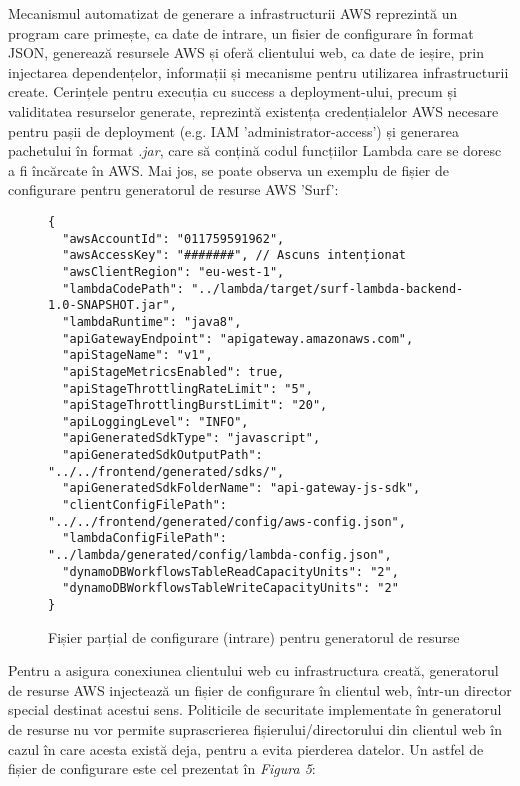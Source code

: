 \noindent
Mecanismul automatizat de generare a infrastructurii AWS reprezintă un program care primește, ca date de intrare, un fisier de configurare în format JSON, generează resursele AWS și oferă clientului web, ca date de ieșire, prin injectarea dependențelor, informații și mecanisme pentru utilizarea infrastructurii create. Cerințele pentru execuția cu success a deployment-ului, precum și validitatea resurselor generate, reprezintă existența credențialelor AWS necesare pentru pașii de deployment (e.g. IAM 'administrator-access') și generarea pachetului în format \emph{.jar}, care să conțină codul funcțiilor Lambda care se doresc a fi încărcate în AWS. Mai jos, se poate observa un exemplu de fișier de configurare pentru generatorul de resurse AWS 'Surf':

\begin{figure}[ht]
\begin{verbatim}
{
  "awsAccountId": "011759591962",
  "awsAccessKey": "#######", // Ascuns intenționat
  "awsClientRegion": "eu-west-1",
  "lambdaCodePath": "../lambda/target/surf-lambda-backend-1.0-SNAPSHOT.jar",
  "lambdaRuntime": "java8",
  "apiGatewayEndpoint": "apigateway.amazonaws.com",
  "apiStageName": "v1",
  "apiStageMetricsEnabled": true,
  "apiStageThrottlingRateLimit": "5",
  "apiStageThrottlingBurstLimit": "20",
  "apiLoggingLevel": "INFO",
  "apiGeneratedSdkType": "javascript",
  "apiGeneratedSdkOutputPath": "../../frontend/generated/sdks/",
  "apiGeneratedSdkFolderName": "api-gateway-js-sdk",
  "clientConfigFilePath": "../../frontend/generated/config/aws-config.json",
  "lambdaConfigFilePath": "../lambda/generated/config/lambda-config.json",
  "dynamoDBWorkflowsTableReadCapacityUnits": "2",
  "dynamoDBWorkflowsTableWriteCapacityUnits": "2"
}
\end{verbatim}
\begin{center}
	\caption{Fișier parțial de configurare (intrare) pentru generatorul de resurse}\par\medskip
	\vspace*{-20pt}
\end{center}
\end{figure}

\noindent
Pentru a asigura conexiunea clientului web cu infrastructura creată, generatorul de resurse AWS injectează un fișier de configurare în clientul web, într-un director special destinat acestui sens. Politicile de securitate implementate în generatorul de resurse nu vor permite suprascrierea fișierului/directorului din clientul web în cazul în care acesta există deja, pentru a evita pierderea datelor. Un astfel de fișier de configurare este cel prezentat în \textit{Figura 5}:
\\

